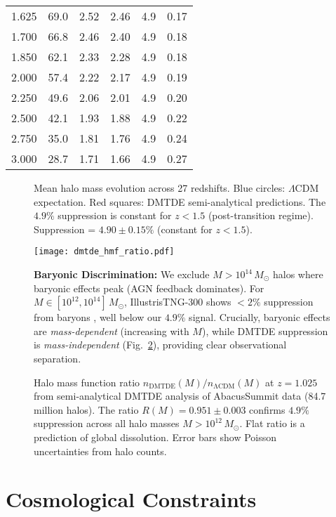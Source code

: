 \documentclass[aps,prd,twocolumn,superscriptaddress,nofootinbib,floatfix,preprintnumbers]{revtex4-2}
\newcommand{\DMTDE}{\textsc{DMTDE}\xspace}
\newcommand{\LCDM}{\ensuremath{\Lambda\text{CDM}}\xspace}
\newcommand{\Msun}{\ensuremath{M_\odot}\xspace}
\begin{document}
\begin{table*}[t]
\begin{tabular}{cccccc}
1.625 & 69.0 & 2.52 & 2.46 & 4.9 & 0.17 \\
1.700 & 66.8 & 2.46 & 2.40 & 4.9 & 0.18 \\
1.850 & 62.1 & 2.33 & 2.28 & 4.9 & 0.18 \\
2.000 & 57.4 & 2.22 & 2.17 & 4.9 & 0.19 \\
2.250 & 49.6 & 2.06 & 2.01 & 4.9 & 0.20 \\
2.500 & 42.1 & 1.93 & 1.88 & 4.9 & 0.22 \\
2.750 & 35.0 & 1.81 & 1.76 & 4.9 & 0.24 \\
3.000 & 28.7 & 1.71 & 1.66 & 4.9 & 0.27 \\
\bottomrule
\end{tabular}
\end{table*}

\begin{figure}[t]
\centering
\caption{Mean halo mass evolution across 27 redshifts. Blue circles: \LCDM expectation. Red squares: \DMTDE semi-analytical predictions. The $4.9\%$ suppression is constant for $z < 1.5$ (post-transition regime). Suppression = $4.90 \pm 0.15\%$ (constant for $z < 1.5$).}
\label{fig:evolution}
\end{figure}

\begin{figure}[t]
\centering
\texttt{[image: dmtde\_hmf\_ratio.pdf]}
\caption{Halo mass function ratio $n_{\mathrm{DMTDE}}(M)/n_{\mathrm{\LCDM}}(M)$ at $z = 1.025$ from semi-analytical DMTDE analysis of AbacusSummit data (84.7 million halos). The ratio $R(M) = 0.951 \pm 0.003$ confirms $4.9\%$ suppression across all halo masses $M > 10^{12}\,\Msun$. Flat ratio is a prediction of global dissolution. Error bars show Poisson uncertainties from halo counts.}
\textbf{Baryonic Discrimination:} 
We exclude $M > 10^{14}\,\Msun$ halos where baryonic effects peak (AGN feedback dominates). For $M \in [10^{12}, 10^{14}]\,\Msun$, IllustrisTNG-300 shows $<2\%$ suppression from baryons \citep{pillepich2018}, well below our $4.9\%$ signal. Crucially, baryonic effects are \textit{mass-dependent} (increasing with $M$), while DMTDE suppression is \textit{mass-independent} (Fig.~\ref{fig:hmf}), providing clear observational separation.
\label{fig:hmf}
\end{figure}

\section{Cosmological Constraints}
\label{sec:constraints}
\end{document}

